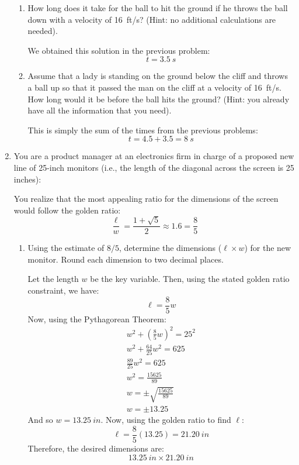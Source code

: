 \documentclass[letterpaper,12pt,fleqn]{article}
\begin{document}
\begin{enumerate}
\begin{enumerate}
  \item How long does it take for the ball to hit the ground if he throws the ball down with a velocity of
    \SI{16}{ft/s}? (Hint: no additional calculations are needed).

    We obtained this solution in the previous problem:
    \[t=\SI{3.5}{s}\]

  \item Assume that a lady is standing on the ground below the cliff and throws a ball up so that it passed the man
    on the cliff at a velocity of \SI{16}{ft/s}.  How long would it be before the ball hits the ground? (Hint: you
    already have all the information that you need).

    This is simply the sum of the times from the previous problems:
    \[t=4.5+3.5=\SI{8}{s}\]
  \end{enumerate}

\item You are a product manager at an electronics firm in charge of a proposed new line of 25-inch monitors (i.e.,
  the length of the diagonal across the screen is 25 inches):


  You realize that the most appealing ratio for the dimensions of the screen would follow the golden ratio:
  \[\frac{\ell}{w}=\frac{1+\sqrt{5}}{2}\approx1.6=\frac{8}{5}\]

  \begin{enumerate}
  \item Using the estimate of $8/5$, determine the dimensions ($\ell\times w$) for the new monitor. Round each
    dimension to two decimal places.

    Let the length \(w\) be the key variable.  Then, using the stated golden ratio constraint, we have:
    \[\ell=\frac{8}{5}w\]
    Now, using the Pythagorean Theorem:
    \begin{gather*}
      w^2+\left(\frac{8}{5}w\right)^2=25^2 \\
      w^2+\frac{64}{25}w^2=625 \\
      \frac{89}{25}w^2=625 \\
      w^2=\frac{15625}{89} \\
      w=\pm\sqrt{\frac{15625}{89}} \\
      w=\pm13.25
    \end{gather*}
    And so \(w=\SI{13.25}{in}\).  Now, using the golden ratio to find \(\ell\):
    \[\ell=\frac{8}{5}(13.25)=\SI{21.20}{in}\]
    Therefore, the desired dimensions are:
    \[\SI{13.25}{in}\times\SI{21.20}{in}\]
    

\end{enumerate}
\end{enumerate}
\end{document}
